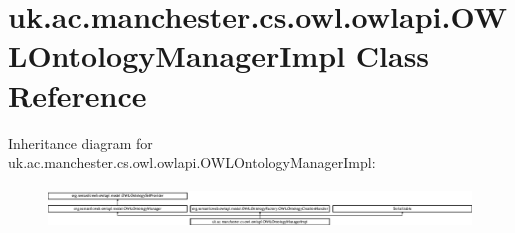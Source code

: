 \hypertarget{classuk_1_1ac_1_1manchester_1_1cs_1_1owl_1_1owlapi_1_1_o_w_l_ontology_manager_impl}{\section{uk.\-ac.\-manchester.\-cs.\-owl.\-owlapi.\-O\-W\-L\-Ontology\-Manager\-Impl Class Reference}
\label{classuk_1_1ac_1_1manchester_1_1cs_1_1owl_1_1owlapi_1_1_o_w_l_ontology_manager_impl}
}
Inheritance diagram for uk.\-ac.\-manchester.\-cs.\-owl.\-owlapi.\-O\-W\-L\-Ontology\-Manager\-Impl\-:\begin{figure}[H]
\begin{center}
\leavevmode
\includegraphics[height=1.131313cm]{classuk_1_1ac_1_1manchester_1_1cs_1_1owl_1_1owlapi_1_1_o_w_l_ontology_manager_impl}
\end{center}
\end{figure}
